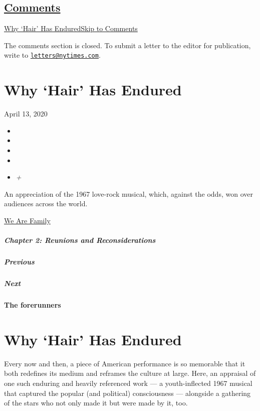 \hypertarget{comments}{%
\subsection{\texorpdfstring{\protect\hyperlink{commentsContainer}{Comments}}{Comments}}\label{comments}}

\href{}{Why `Hair' Has Endured}\href{}{Skip to Comments}

The comments section is closed. To submit a letter to the editor for
publication, write to
\href{mailto:letters@nytimes.com}{\nolinkurl{letters@nytimes.com}}.

\hypertarget{why-hair-has-endured}{%
\section{Why `Hair' Has Endured}\label{why-hair-has-endured}}

April 13, 2020

\begin{itemize}
\item
\item
\item
\item
\item
  \emph{+}
\end{itemize}

An appreciation of the 1967 love-rock musical, which, against the odds,
won over audiences across the world.

\href{https://www.nytimes.com/interactive/2020/04/13/t-magazine/culture-issue-2020.html}{We
Are Family}

\hypertarget{chapter-2-reunions-and-reconsiderations}{%
\subparagraph{Chapter 2: Reunions and
Reconsiderations}\label{chapter-2-reunions-and-reconsiderations}}

\hypertarget{previous}{%
\subparagraph{Previous}\label{previous}}

\hypertarget{next}{%
\subparagraph{Next}\label{next}}

\textbf{The forerunners}

\hypertarget{why-hair-has-endured-1}{%
\section{Why `Hair' Has Endured}\label{why-hair-has-endured-1}}

Every now and then, a piece of American performance is so memorable that
it both redefines its medium and reframes the culture at large. Here, an
appraisal of one such enduring and heavily referenced work --- a
youth-inflected 1967 musical that captured the popular (and political)
consciousness --- alongside a gathering of the stars who not only made
it but were made by it, too.

